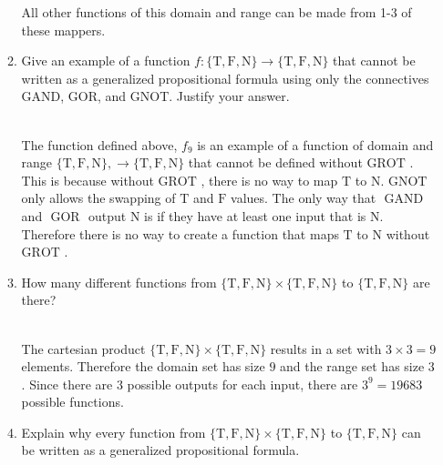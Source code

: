\documentclass[11pt]{article}
\newcommand{\True}{\mbox{T}}
\newcommand{\False}{\mbox{F}}
\newcommand{\Neither}{\mbox{N}}
\newcommand{\gor}{\mbox{ GOR }}
\newcommand{\gand}{\mbox{ GAND }}
\newcommand{\gnot}{\mbox{GNOT }}
\newcommand{\grot}{\mbox{GROT }}
\begin{document}
\begin{enumerate}
\begin{enumerate}
\begin{solution}
All other functions of this domain and range can be made from 1-3 of these mappers.\\
\end{solution}
\item
\begin{question}
Give an example of a function $f:\{\True,\False,\Neither\}  \rightarrow \{\True,\False,\Neither\}$ that cannot be written as
a generalized propositional formula using only the connectives GAND, GOR, and GNOT.
Justify your answer.\\\\
\end{question}
\begin{solution}
The function defined above, $f_9$ is an example of a function of domain and range $\{\True,\False,\Neither\}, \rightarrow \{\True,\False,\Neither\}$ that cannot be defined without $\grot$. This is because without $\grot$, there is no way to map $\True$ to $\Neither$. $\gnot$ only allows the swapping of $\True$ and $\False$ values. The only way that $\gand$ and $\gor$ output $\Neither$ is if they have at least one input that is $\Neither$. Therefore there is no way to create a function that maps $\True$ to $\Neither$ without $\grot$.\\
\end{solution}
\item
\begin{question}
How many different functions from $\{ \True,\False,\Neither\} \times \{ \True,\False,\Neither\}$ to $\{ \True,\False,\Neither\}$ are there?\\\\
\end{question}
\begin{solution}
The cartesian product $\{ \True,\False,\Neither\} \times \{ \True,\False,\Neither\}$ results in a set with $3
\times 3=9$ elements. Therefore the domain set has size $9$ and the range set has size $3$. Since there are $3$ possible outputs for each input, there are $3^9=19683$ possible functions.\\
\end{solution}
\item
\begin{question}
Explain why every function from $\{ \True,\False,\Neither\} \times \{ \True,\False,\Neither\}$ to $\{ \True,\False,\Neither\}$
can be written
as a generalized propositional formula.\\\\
\end{question}

\end{enumerate}
\end{enumerate}
\end{document}
